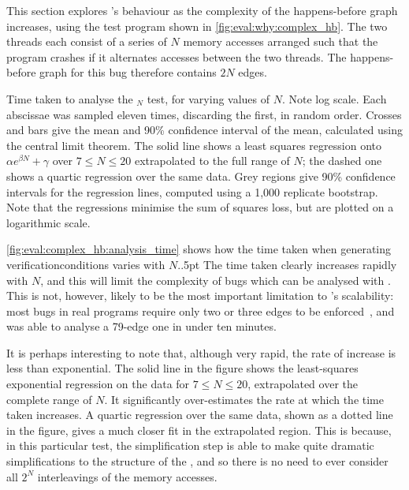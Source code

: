 \noindent
This section explores {\implementation}'s behaviour as the complexity of
the happens-before graph increases, using the test program shown in
\autoref{fig:eval:why:complex_hb}.  The two threads each consist of a
series of $N$ memory accesses arranged such that the program crashes
if it alternates accesses between the two threads.  The happens-before
graph for this bug therefore contains $2N$ edges.

\begin{sanefig}
  \caption{Time taken to analyse the $_N$ test,
    for varying values of $N$.  Note log scale.  Each abscissae was
    sampled eleven times, discarding the first, in random order.
    Crosses and bars give the mean and 90\% confidence interval of the
    mean, calculated using the central limit theorem.  The solid line
    shows a least squares regression onto ${\alpha}e^{{\beta}N} +
    \gamma$ over $7 \leq N \leq 20$ extrapolated to the full range of
    $N$; the dashed one shows a quartic regression over the same data.
    Grey regions give 90\% confidence intervals for the regression
    lines, computed using a 1,000 replicate bootstrap.  Note that the
    regressions minimise the sum of squares loss, but are plotted on a
    logarithmic scale.}
  \label{fig:eval:complex_hb:analysis_time}
\end{sanefig}

\autoref{fig:eval:complex_hb:analysis_time} shows how the time taken
when generating \glspl{verificationcondition} varies with
$N$\kern-1pt.\kern.5pt  The time taken clearly
increases rapidly with $N$\kern-1pt, and this will limit the complexity of bugs
which can be analysed with {\technique}.  This is not, however, likely
to be the most important limitation to {\technique}'s scalability:
most bugs in real programs require only two or three edges to be
enforced~\cite{Musuvathi2008}, and {\implementation} was able to analyse a
79-edge one in under ten minutes.

It is perhaps interesting to note that, although very rapid, the rate
of increase is less than exponential.  The solid line in the figure
shows the least-squares exponential regression on the data for $7 \leq
N \leq 20$, extrapolated over the
complete range of $N$.  It significantly over-estimates the rate at
which the time taken increases.  A quartic regression over the same
data, shown as a dotted line in the figure, gives a much closer fit in
the extrapolated region.  This is because, in this particular test,
the {\StateMachine} simplification step is able to make quite dramatic
simplifications to the structure of the {\StateMachines}, and so there
is no need to ever consider all $2^N$ interleavings of the memory
accesses.

